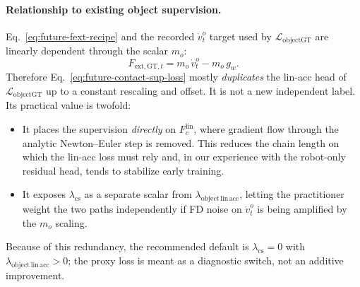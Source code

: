 \documentclass[11pt]{article}
\begin{document}
\paragraph{Relationship to existing object supervision.}
Eq.~\eqref{eq:future-fext-recipe} and the recorded
$\dot v^o_t$ target used by $\mathcal{L}_{\mathrm{objectGT}}$ are linearly
dependent through the scalar $m_o$:
\begin{equation}
  F_{\mathrm{ext,GT},t} = m_o\,\dot v^o_t - m_o\,g_w.
\end{equation}
Therefore Eq.~\eqref{eq:future-contact-sup-loss} mostly \emph{duplicates}
the lin-acc head of $\mathcal{L}_{\mathrm{objectGT}}$ up to a constant
rescaling and offset. It is not a new independent label. Its practical
value is twofold:
\begin{itemize}
  \item It places the supervision \emph{directly} on
    $F_c^{\mathrm{lin}}$, where gradient flow through the analytic
    Newton--Euler step is removed. This reduces the chain length on
    which the lin-acc loss must rely and, in our experience with the
    robot-only residual head, tends to stabilize early training.
  \item It exposes $\lambda_{\mathrm{cs}}$ as a separate scalar from
    $\lambda_{\mathrm{object\,lin\,acc}}$, letting the practitioner
    weight the two paths independently if FD noise on $\dot v^o_t$ is
    being amplified by the $m_o$ scaling.
\end{itemize}
Because of this redundancy, the recommended default is
$\lambda_{\mathrm{cs}}=0$ with $\lambda_{\mathrm{object\,lin\,acc}}>0$;
the proxy loss is meant as a diagnostic switch, not an additive
improvement.
\end{document}
